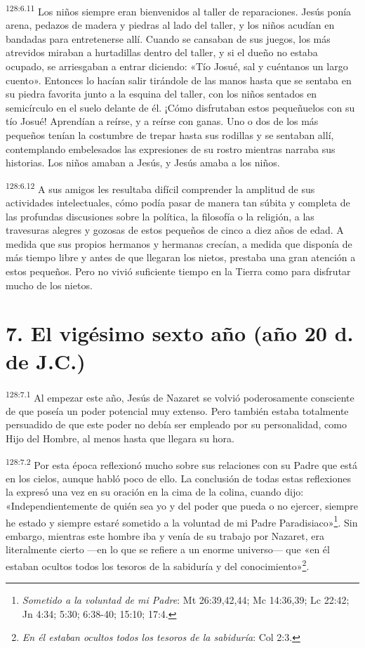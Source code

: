 \par
\textsuperscript{128:6.11} Los niños siempre eran bienvenidos al taller de reparaciones. Jesús ponía arena, pedazos de madera y piedras al lado del taller, y los niños acudían en bandadas para entretenerse allí. Cuando se cansaban de sus juegos, los más atrevidos miraban a hurtadillas dentro del taller, y si el dueño no estaba ocupado, se arriesgaban a entrar diciendo: «Tío Josué, sal y cuéntanos un largo cuento». Entonces lo hacían salir tirándole de las manos hasta que se sentaba en su piedra favorita junto a la esquina del taller, con los niños sentados en semicírculo en el suelo delante de él. ¡Cómo disfrutaban estos pequeñuelos con su tío Josué! Aprendían a reírse, y a reírse con ganas. Uno o dos de los más pequeños tenían la costumbre de trepar hasta sus rodillas y se sentaban allí, contemplando embelesados las expresiones de su rostro mientras narraba sus historias. Los niños amaban a Jesús, y Jesús amaba a los niños.

\par
\textsuperscript{128:6.12} A sus amigos les resultaba difícil comprender la amplitud de sus actividades intelectuales, cómo podía pasar de manera tan súbita y completa de las profundas discusiones sobre la política, la filosofía o la religión, a las travesuras alegres y gozosas de estos pequeños de cinco a diez años de edad. A medida que sus propios hermanos y hermanas crecían, a medida que disponía de más tiempo libre y antes de que llegaran los nietos, prestaba una gran atención a estos pequeños. Pero no vivió suficiente tiempo en la Tierra como para disfrutar mucho de los nietos.

\section*{7. El vigésimo sexto año (año 20 d. de J.C.)}
\par
\textsuperscript{128:7.1} Al empezar este año, Jesús de Nazaret se volvió poderosamente consciente de que poseía un poder potencial muy extenso. Pero también estaba totalmente persuadido de que este poder no debía ser empleado por su personalidad, como Hijo del Hombre, al menos hasta que llegara su hora.

\par
\textsuperscript{128:7.2} Por esta época reflexionó mucho sobre sus relaciones con su Padre que está en los cielos, aunque habló poco de ello. La conclusión de todas estas reflexiones la expresó una vez en su oración en la cima de la colina, cuando dijo: «Independientemente de quién sea yo y del poder que pueda o no ejercer, siempre he estado y siempre estaré sometido a la voluntad de mi Padre Paradisiaco»\footnote{\textit{Sometido a la voluntad de mi Padre}: Mt 26:39,42,44; Mc 14:36,39; Lc 22:42; Jn 4:34; 5:30; 6:38-40; 15:10; 17:4.}. Sin embargo, mientras este hombre iba y venía de su trabajo por Nazaret, era literalmente cierto ---en lo que se refiere a un enorme universo--- que «en él estaban ocultos todos los tesoros de la sabiduría y del conocimiento»\footnote{\textit{En él estaban ocultos todos los tesoros de la sabiduría}: Col 2:3.}.

